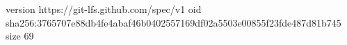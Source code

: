 version https://git-lfs.github.com/spec/v1
oid sha256:3765707e88db4fe4abaf46b0402557169df02a5503e00855f23fde487d81b745
size 69
